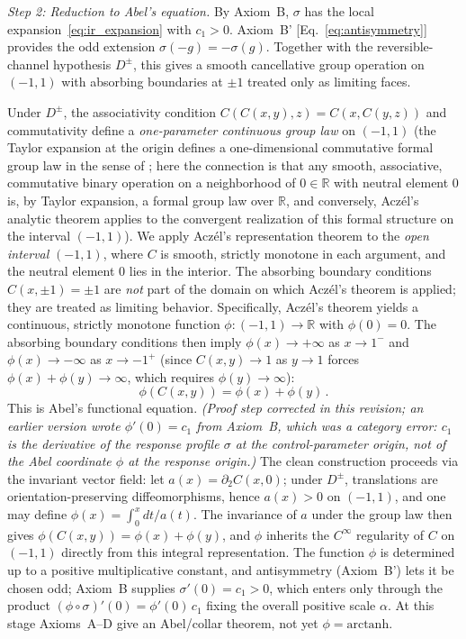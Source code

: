 \documentclass[aps,prd,twocolumn,superscriptaddress,nofootinbib]{revtex4-2}
\begin{document}
\textit{Step 2: Reduction to Abel's equation.}
By Axiom~B, $\sigma$ has the local expansion~\eqref{eq:ir_expansion} with $c_1 > 0$. Axiom~B' [Eq.~\eqref{eq:antisymmetry}] provides the odd extension $\sigma(-g)=-\sigma(g)$. Together with the reversible-channel hypothesis $D^\pm$, this gives a smooth cancellative group operation on $(-1,1)$ with absorbing boundaries at $\pm 1$ treated only as limiting faces.

Under $D^\pm$, the associativity condition $C(C(x,y),z) = C(x, C(y,z))$ and commutativity define a \textit{one-parameter continuous group law} on $(-1,1)$ (the Taylor expansion at the origin defines a one-dimensional commutative formal group law in the sense of \cite{Hazewinkel1978}; here the connection is that any smooth, associative, commutative binary operation on a neighborhood of $0 \in \mathbb{R}$ with neutral element $0$ is, by Taylor expansion, a formal group law over $\mathbb{R}$, and conversely, Acz\'el's analytic theorem applies to the convergent realization of this formal structure on the interval $(-1,1)$). We apply Acz\'el's representation theorem \cite{Aczel1966} to the \textit{open interval} $(-1,1)$, where $C$ is smooth, strictly monotone in each argument, and the neutral element $0$ lies in the interior. The absorbing boundary conditions $C(x, \pm 1) = \pm 1$ are \textit{not} part of the domain on which Acz\'el's theorem is applied; they are treated as limiting behavior. Specifically, Acz\'el's theorem yields a continuous, strictly monotone function $\phi: (-1,1) \to \mathbb{R}$ with $\phi(0) = 0$. The absorbing boundary conditions then imply $\phi(x) \to +\infty$ as $x \to 1^-$ and $\phi(x) \to -\infty$ as $x \to -1^+$ (since $C(x,y) \to 1$ as $y \to 1$ forces $\phi(x) + \phi(y) \to \infty$, which requires $\phi(y) \to \infty$):
\begin{equation}
\phi(C(x,y)) = \phi(x) + \phi(y)\,.
\label{eq:abel}
\end{equation}
This is Abel's functional equation. \emph{(Proof step corrected in this revision; an earlier version wrote $\phi'(0)=c_1$ from Axiom~B, which was a category error: $c_1$ is the derivative of the response profile $\sigma$ at the control-parameter origin, not of the Abel coordinate $\phi$ at the response origin.)} The clean construction proceeds via the invariant vector field: let $a(x) = \partial_2 C(x,0)$; under $D^\pm$, translations are orientation-preserving diffeomorphisms, hence $a(x) > 0$ on $(-1,1)$, and one may define $\phi(x) = \int_0^x dt/a(t)$. The invariance of $a$ under the group law then gives $\phi(C(x,y)) = \phi(x) + \phi(y)$, and $\phi$ inherits the $C^\infty$ regularity of $C$ on $(-1,1)$ directly from this integral representation. The function $\phi$ is determined up to a positive multiplicative constant, and antisymmetry (Axiom~B') lets it be chosen odd; Axiom~B supplies $\sigma'(0) = c_1 > 0$, which enters only through the product $(\phi\circ\sigma)'(0) = \phi'(0)\,c_1$ fixing the overall positive scale $\alpha$. At this stage Axioms~A--D give an Abel/collar theorem, not yet $\phi=\mathrm{arctanh}$.
\end{document}
